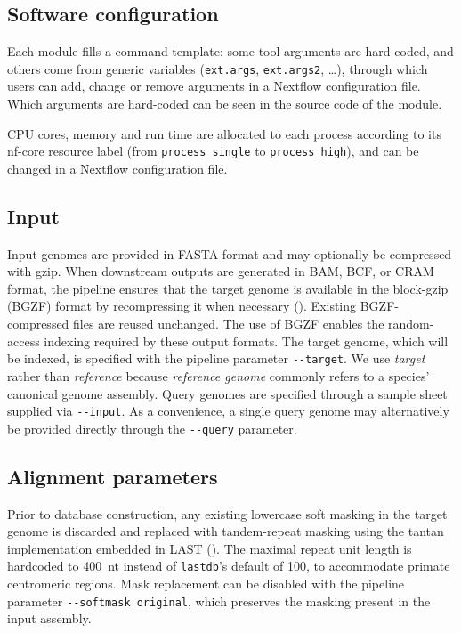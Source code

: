 \documentclass[PCJ,Unicode,screen]{cedram}
\begin{document}
\subsection*{Software configuration}

Each module fills a command template: some tool arguments are hard-coded, and others come from generic variables (\texttt{ext.args}, \texttt{ext.args2}, \ldots), through which users can add, change or remove arguments in a Nextflow configuration file. Which arguments are hard-coded can be seen in the source code of the module.

CPU cores, memory and run time are allocated to each process according to its nf-core resource label (from \texttt{process\_single} to \texttt{process\_high}), and can be changed in a Nextflow configuration file.

\subsection*{Input}

Input genomes are provided in FASTA format and may optionally be compressed with gzip. When downstream outputs are generated in BAM, BCF, or CRAM format, the pipeline ensures that the target genome is available in the block-gzip (BGZF) format by recompressing it when necessary (\cite{Li_2011}). Existing BGZF-compressed files are reused unchanged. The use of BGZF enables the random-access indexing required by these output formats. The target genome, which will be indexed, is specified with the pipeline parameter \verb|--target|. We use \emph{target} rather than \emph{reference} because \emph{reference genome} commonly refers to a species' canonical genome assembly. Query genomes are specified through a sample sheet supplied via \verb|--input|. As a convenience, a single query genome may alternatively be provided directly through the \verb|--query| parameter.

\subsection*{Alignment parameters}

Prior to database construction, any existing lowercase soft masking in the target genome is discarded and replaced with tandem-repeat masking using the tantan implementation embedded in LAST (\cite{Frith_2011}). The maximal repeat unit length is hardcoded to 400~nt instead of \verb|lastdb|'s default of 100, to accommodate primate centromeric regions. Mask replacement can be disabled with the pipeline parameter \verb|--softmask original|, which preserves the masking present in the input assembly.
\end{document}
